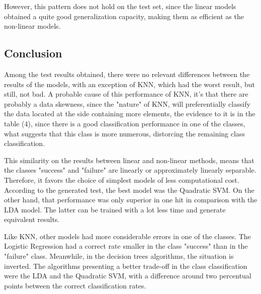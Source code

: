 \documentclass[conference]{IEEEtran}
\begin{document}
However, this pattern does not hold on the test set, since the linear models obtained 
a quite good generalization capacity, making them as efficient as the non-linear models.

\subsection{Conclusion}

Among the test results obtained, there were no relevant differences between the results 
of the models, with an exception of KNN, which had the worst result, but still, not bad. 
A probable cause of this performance of KNN, it's that there are probably a data skewness, 
since the "nature" of KNN, will preferentially classify the data located at the side 
containing more elements, the evidence to it is in the table (4), since there is a 
good classification performance in one of the classes, what suggests that this class 
is more numerous, distorcing the remaining class classification.

This similarity on the results between linear and non-linear methods, means that 
the classes "success" and "failure" are linearly or approximately linearly separable. 
Therefore, it favors the choice of simplest models of less computational cost. 
According to the generated test, the best model was the Quadratic SVM. On the other hand,
that performance was only superior in one hit in comparison with the LDA model. The latter
can be trained with a lot less time and generate equivalent results. 

Like KNN, other models had more considerable errors in one of the classes. The Logistic
Regression had a correct rate smaller in the class "success" than in the "failure" class.
Meanwhile, in the decision trees algorithms, the situation is inverted.  The algorithms 
presenting a better trade-off in the class classification were the LDA and the 
Quadratic SVM, with a difference around two percentual points between the correct 
classification rates.
\end{document}
